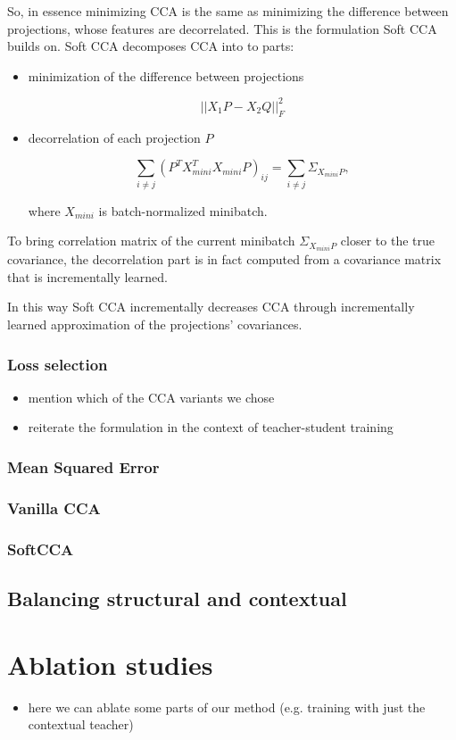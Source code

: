 So, in essence minimizing CCA is the same as minimizing the difference between
projections, whose features are decorrelated. This is the formulation Soft CCA
builds on. Soft CCA decomposes CCA into to parts:

\begin{itemize}
  \item minimization of the difference between projections

    \begin{equation}
      ||X_1P - X_2Q||^2_F
    \end{equation}

  \item decorrelation of each projection $P$

    \begin{equation}
      \sum_{i \ne j} (P^TX^T_{mini}X_{mini}P)_{ij} = \sum_{i \ne j} \Sigma_{X_{mini}P},
    \end{equation}

    where $X_{mini}$ is batch-normalized minibatch.

\end{itemize}

To bring correlation matrix of the current minibatch $\Sigma_{X_{mini}P}$
closer to the true covariance, the decorrelation part is in fact computed from
a covariance matrix that is incrementally learned.

In this way Soft CCA incrementally decreases CCA through incrementally learned
approximation of the projections' covariances.

\subsubsection{Loss selection}

\begin{itemize}
    \item mention which of the CCA variants we chose
    \item reiterate the formulation in the context of teacher-student training
\end{itemize}

\subsubsection{Mean Squared Error}
\subsubsection{Vanilla CCA}
\subsubsection{SoftCCA}
\subsection{Balancing structural and contextual}


\section{Ablation studies}

\begin{itemize}
  \item here we can ablate some parts of our method (e.g. training with just
    the contextual teacher)
\end{itemize}
